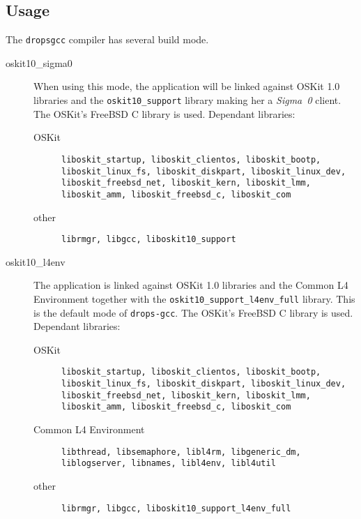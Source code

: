 \documentclass[twocolumn,10pt]{article}
\begin{document}
\subsection{Usage}
The \texttt{dropsgcc} compiler has several build mode.

\begin{description}
\item[oskit10\_sigma0]
  When using this mode, the application will be linked against OSKit 1.0
  libraries and the \texttt{oskit10\_support} library making her a 
  \textsl{Sigma~0} client. The OSKit's FreeBSD C library is used.
  Dependant libraries:
  \begin{description}
  \item[OSKit]
  \texttt{liboskit\_startup, liboskit\_clientos, liboskit\_bootp,
  liboskit\_linux\_fs, liboskit\_diskpart, liboskit\_linux\_dev, 
  liboskit\_freebsd\_net, liboskit\_kern, liboskit\_lmm, liboskit\_amm, 
  liboskit\_freebsd\_c, liboskit\_com}
  \item[other]
  \texttt{librmgr, libgcc, liboskit10\_support}
  \end{description}

\item[oskit10\_l4env]
  The application is linked against OSKit 1.0 libraries and the Common L4
  Environment together with the \texttt{oskit10\_support\_l4env\_full}
  library. This is the default mode of \texttt{drops-gcc}. The OSKit's
  FreeBSD C library is used. Dependant libraries:
  \begin{description}
  \item[OSKit]
  \texttt{liboskit\_startup, liboskit\_clientos, liboskit\_bootp,
  liboskit\_linux\_fs, liboskit\_diskpart, liboskit\_linux\_dev,
  liboskit\_freebsd\_net, liboskit\_kern, liboskit\_lmm, liboskit\_amm,
  liboskit\_freebsd\_c, liboskit\_com}
  \item[Common L4 Environment]
  \texttt{libthread, libsemaphore, libl4rm, libgeneric\_dm, liblogserver,
  libnames, libl4env, libl4util}
  \item[other]
  \texttt{librmgr, libgcc, liboskit10\_support\_l4env\_full}
  \end{description}


\end{description}
\end{document}

